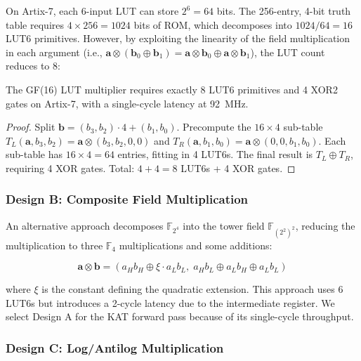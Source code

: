 On Artix-7, each 6-input LUT can store $2^6 = 64$ bits. The 256-entry,
4-bit truth table requires $4 \times 256 = 1024$ bits of ROM, which
decomposes into $1024/64 = 16$ LUT6 primitives. However, by exploiting
the linearity of the field multiplication in each argument (i.e.,
$\mathbf{a} \otimes (\mathbf{b}_0 \oplus \mathbf{b}_1) =
\mathbf{a} \otimes \mathbf{b}_0 \oplus \mathbf{a} \otimes \mathbf{b}_1$),
the LUT count reduces to 8:

\begin{proposition}
\label{prop:hwbridge:mul-lut-cost}
The GF(16) LUT multiplier requires exactly 8 LUT6 primitives and 4 XOR2
gates on Artix-7, with a single-cycle latency at 92~MHz.
\end{proposition}

\begin{proof}
Split $\mathbf{b} = (b_3, b_2) \cdot 4 + (b_1, b_0)$. Precompute the
$16 \times 4$ sub-table $T_L(\mathbf{a}, b_3, b_2) = \mathbf{a} \otimes (b_3, b_2, 0, 0)$
and $T_R(\mathbf{a}, b_1, b_0) = \mathbf{a} \otimes (0, 0, b_1, b_0)$.
Each sub-table has $16 \times 4 = 64$ entries, fitting in 4 LUT6s.
The final result is $T_L \oplus T_R$, requiring 4 XOR gates.
Total: $4 + 4 = 8$ LUT6s + 4 XOR gates.
\end{proof}

\subsubsection{Design B: Composite Field Multiplication}

An alternative approach decomposes $\mathbb{F}_{2^4}$ into the tower field
$\mathbb{F}_{(2^2)^2}$, reducing the multiplication to three $\mathbb{F}_{4}$
multiplications and some additions:

\begin{equation}
  \mathbf{a} \otimes \mathbf{b} = (a_H b_H \oplus \xi \cdot a_L b_L,\;
  a_H b_L \oplus a_L b_H \oplus a_L b_L)
\end{equation}

where $\xi$ is the constant defining the quadratic extension. This approach
uses 6 LUT6s but introduces a 2-cycle latency due to the intermediate
register. We select Design A for the KAT forward pass because of its
single-cycle throughput.

\subsubsection{Design C: Log/Antilog Multiplication}

